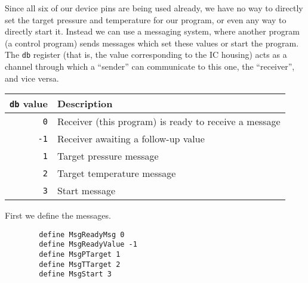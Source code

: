 \documentclass{article}
\begin{document}
Since all six of our device pins are being used already, we have no way
to directly set the target pressure and temperature for our program,
or even any way to directly start it.
Instead we can use a messaging system, where another program (a control program)
sends messages which set these values or start the program.
The \verb+db+ register (that is, the value corresponding to the IC housing)
acts as a channel through which a ``sender'' can communicate to this one,
the ``receiver'', and vice versa.
\begin{center}
    \begin{tabular}{rl}
        \toprule
        \verb+db+ value & Description \\
        \midrule
        \verb+0+        & Receiver (this program) is ready to receive a message \\
        \verb+-1+       & Receiver awaiting a follow-up value \\
        \verb+1+        & Target pressure message \\
        \verb+2+        & Target temperature message \\
        \verb+3+        & Start message \\
        \bottomrule
    \end{tabular}
\end{center}
\begin{paracol}{2}
    First we define the messages.
    \switchcolumn
    \begin{verbatim}
        define MsgReadyMsg 0
        define MsgReadyValue -1
        define MsgPTarget 1
        define MsgTTarget 2
        define MsgStart 3
    \end{verbatim}
\end{paracol}
\end{document}
